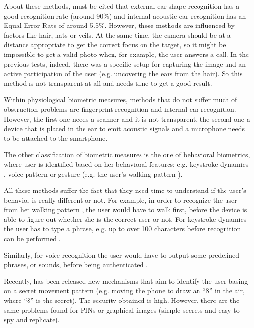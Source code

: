 About these methods, must be cited that external ear shape recognition \cite{1296543, face-ear-images} has a good recognition rate (around 90\%) and internal acoustic ear recognition \cite{1104752} has an Equal Error Rate of around 5.5\%. However, these methods are influenced by factors like hair, hats or veils. At the same time, the camera should be at a distance appropriate to get the correct focus on the target, so it might be impossible to get a valid photo when, for example, the user answers a call. In the previous tests, indeed, there was a specific setup for capturing the image and an active participation of the user (e.g. uncovering the ears from the hair). So this method is not transparent at all and needs time to get a good result.

Within physiological biometric measures, methods that do not suffer much of obstruction problems are fingerprint recognition \cite{621409} and internal ear recognition. However, the first one needs a scanner and it is not transparent, the second one a device that is placed in the ear to emit acoustic signals and a microphone needs to be attached to the smartphone.

The other classification of biometric measures is the one of behavioral biometrics, where user is identified based on her behavioral features: e.g. keystroke dynamics \cite{Gunetti:TISSEC:2005}, voice pattern \cite{348995} or gesture (e.g. the user's walking pattern \cite{gait}). 

All these methods suffer the fact that they need time to understand if the user's behavior is really different or not. For example, in order to recognize the user from her walking pattern \cite{gait}, the user would have to walk first, before
the device is able to figure out whether she is the correct user or not. For keystroke dynamics the user has to type a phrase, e.g. up to over 100 characters before recognition can be performed \cite{Joyce:CommACM:1990, Leggett:IJMMS:1988, Gunetti:TISSEC:2005}.

Similarly, for voice recognition the user would have to output some predefined phrases, or sounds, before being authenticated \cite{348995}.

Recently, has been released new mechanisms that aim to identify the user basing on a secret movement pattern \cite{accelerometer} (e.g. moving the phone to draw an ``8'' in the air, where ``8'' is the secret). The security obtained is high. However, there are the same problems found for PINs or graphical images (simple secrets and easy to spy and replicate).

